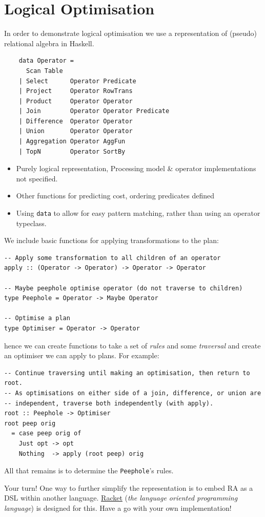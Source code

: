 
\section{Logical Optimisation}
In order to demonstrate logical optimisation we use a representation of
(pseudo) relational algebra in Haskell.
\begin{center}
    \begin{minipage}{.5\textwidth}
        \begin{verbatim}
    data Operator = 
      Scan Table
    | Select      Operator Predicate
    | Project     Operator RowTrans
    | Product     Operator Operator
    | Join        Operator Operator Predicate
    | Difference  Operator Operator
    | Union       Operator Operator
    | Aggregation Operator AggFun
    | TopN        Operator SortBy
    \end{verbatim}
    \end{minipage} \hfill \begin{minipage}{.49\textwidth}
        \begin{itemize}
            \item Purely logical representation, Processing model \& operator implementations not specified.
            \item Other functions for predicting cost, ordering predicates defined
            \item Using \texttt{data} to allow for easy pattern matching, rather than using an operator typeclass.
        \end{itemize}
    \end{minipage}
\end{center}
We include basic functions for applying transformations to the plan:
\begin{verbatim}
-- Apply some transformation to all children of an operator
apply :: (Operator -> Operator) -> Operator -> Operator

-- Maybe peephole optimise operator (do not traverse to children)
type Peephole = Operator -> Maybe Operator

-- Optimise a plan 
type Optimiser = Operator -> Operator
\end{verbatim}
hence we can create functions to take a set of \textit{rules} and some \textit{traversal} and create an optimiser we can apply to plans. For example:
\begin{verbatim}
-- Continue traversing until making an optimisation, then return to root.
-- As optimisations on either side of a join, difference, or union are 
-- independent, traverse both independently (with apply).
root :: Peephole -> Optimiser
root peep orig 
  = case peep orig of
    Just opt -> opt
    Nothing  -> apply (root peep) orig
\end{verbatim}
All that remains is to determine the \texttt{Peephole}'s rules.
\begin{sidenotebox}{Your turn!}
    One way to further simplify the representation is to embed RA as a DSL within another language. \href{https://racket-lang.org/}{Racket} (\textit{the language oriented programming language}) is designed for this. Have a go with your own implementation!
\end{sidenotebox}
